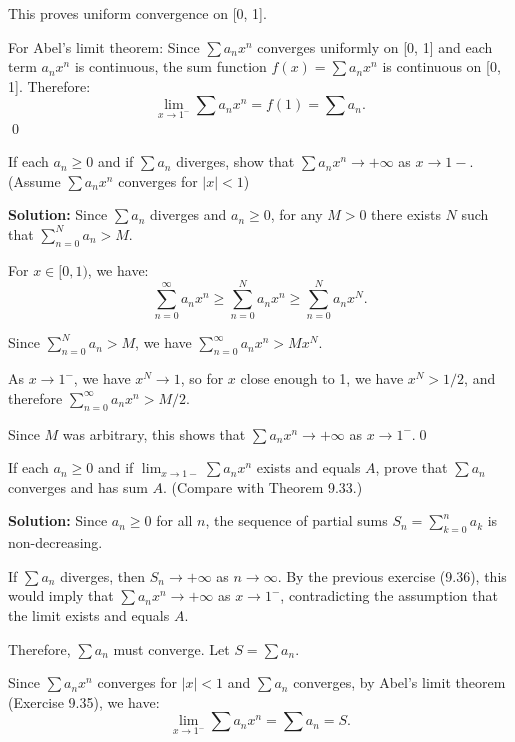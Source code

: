 This proves uniform convergence on [0, 1].

For Abel's limit theorem: Since \( \sum a_n x^n \) converges uniformly on [0, 1] and each term \( a_n x^n \) is continuous, the sum function \( f(x) = \sum a_n x^n \) is continuous on [0, 1]. Therefore:
\[\lim_{x \to 1^-} \sum a_n x^n = f(1) = \sum a_n.\]\qed


\begin{problembox}
If each \( a_n \geq 0 \) and if \( \sum a_n \) diverges, show that \( \sum a_n x^n \to + \infty \) as \( x \to 1- \). (Assume \( \sum a_n x^n \) converges for \( |x| < 1 \))
\end{problembox}

\noindent\textbf{Solution:} Since \( \sum a_n \) diverges and \( a_n \geq 0 \), for any \( M > 0 \) there exists \( N \) such that \( \sum_{n=0}^N a_n > M \).

For \( x \in [0, 1) \), we have:
\[\sum_{n=0}^{\infty} a_n x^n \geq \sum_{n=0}^N a_n x^n \geq \sum_{n=0}^N a_n x^N.\]

Since \( \sum_{n=0}^N a_n > M \), we have \( \sum_{n=0}^{\infty} a_n x^n > M x^N \).

As \( x \to 1^- \), we have \( x^N \to 1 \), so for \( x \) close enough to 1, we have \( x^N > 1/2 \), and therefore \( \sum_{n=0}^{\infty} a_n x^n > M/2 \).

Since \( M \) was arbitrary, this shows that \( \sum a_n x^n \to +\infty \) as \( x \to 1^- \).\qed


\begin{problembox}
If each \( a_n \geq 0 \) and if \( \lim_{x \to 1-} \sum a_n x^n \) exists and equals \( A \), prove that \( \sum a_n \) converges and has sum \( A \). (Compare with Theorem 9.33.)
\end{problembox}

\noindent\textbf{Solution:} Since \( a_n \geq 0 \) for all \( n \), the sequence of partial sums \( S_n = \sum_{k=0}^n a_k \) is non-decreasing.

If \( \sum a_n \) diverges, then \( S_n \to +\infty \) as \( n \to \infty \). By the previous exercise (9.36), this would imply that \( \sum a_n x^n \to +\infty \) as \( x \to 1^- \), contradicting the assumption that the limit exists and equals \( A \).

Therefore, \( \sum a_n \) must converge. Let \( S = \sum a_n \).

Since \( \sum a_n x^n \) converges for \( |x| < 1 \) and \( \sum a_n \) converges, by Abel's limit theorem (Exercise 9.35), we have:
\[\lim_{x \to 1^-} \sum a_n x^n = \sum a_n = S.\]

